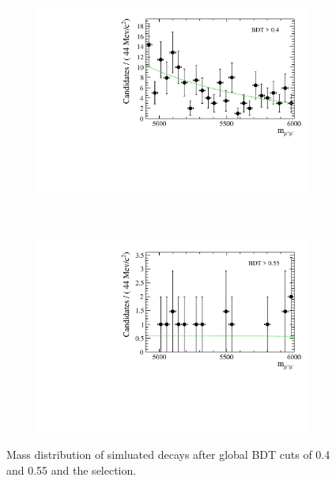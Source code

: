 {\begin{figure}
    \centering
    \begin{subfigure}[b]{0.7\textwidth}
        \includegraphics[width=\textwidth]{./Figs/Selection/BDT0p4.pdf}
        \caption{ }
        \label{fig:BDT0p4}
    \end{subfigure}
    ~ %
    \begin{subfigure}[b]{0.7\textwidth}
       \includegraphics[width=\textwidth]{./Figs/Selection/BDT0p55.pdf}
        \caption{ }
        \label{fig:BDT0p5}
    \end{subfigure}
    \caption{Mass distribution of \bbarmumux simluated decays after global BDT cuts of 0.4 and 0.55 and the \bsmumu selection.}
    \label{fig:BDTmasses}
\end{figure}



}
